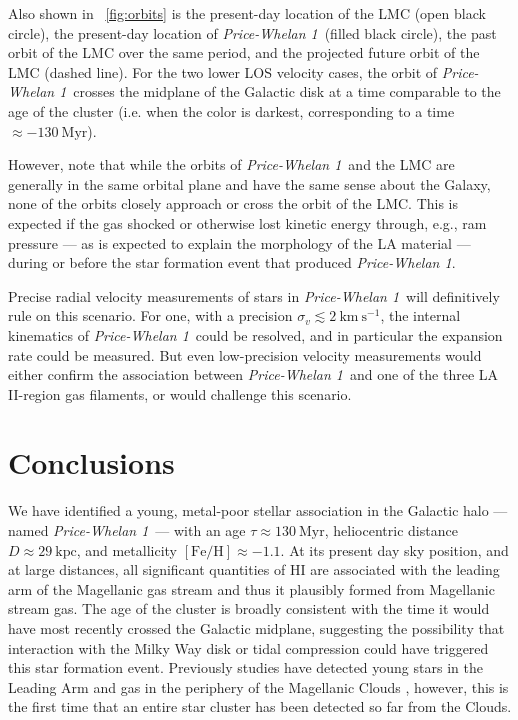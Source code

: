 \documentclass[twocolumn]{aastex62}
\newcommand{\kms}{\ensuremath{\textrm{km}~\textrm{s}^{-1}}}
\newcommand{\feh}{\ensuremath{[\textrm{Fe} / \textrm{H}]}}
\newcommand{\hi}{H{\footnotesize I} }
\newcommand{\clustername}{\textsl{Price-Whelan 1}}
\newcommand{\clage}{\ensuremath{130~\textrm{Myr}}}
\newcommand{\clfeh}{\ensuremath{-1.1}}
\newcommand{\cldist}{\ensuremath{29~\textrm{kpc}}}
\begin{document}
Also shown in \figurename~\ref{fig:orbits} is the present-day location of the LMC (open black circle), the present-day location of \clustername\ (filled black circle), the past orbit of the LMC over the same period, and the projected future orbit of the LMC (dashed line).
For the two lower LOS velocity cases, the orbit of \clustername\ crosses the midplane of the Galactic disk at a time comparable to the age of the cluster (i.e. when the color is darkest, corresponding to a time $\approx -130~\textrm{Myr}$).

However, note that while the orbits of \clustername\ and the LMC are generally in the same orbital plane and have the same sense about the Galaxy, none of the orbits closely approach or cross the orbit of the LMC.
This is expected if the gas shocked or otherwise lost kinetic energy through, e.g., ram pressure --- as is expected to explain the morphology of the LA material \citep[e.g.,][]{Hammer:2015} --- during or before the star formation event that produced \clustername.

Precise radial velocity measurements of stars in \clustername\ will definitively rule on this scenario.
For one, with a precision $\sigma_v \lesssim 2~\kms$, the internal kinematics of \clustername\ could be resolved, and in particular the expansion rate could be measured.
But even low-precision velocity measurements would either confirm the association between \clustername\ and one of the three LA II-region gas filaments, or would challenge this scenario.


\section{Conclusions} \label{sec:conclusion}

We have identified a young, metal-poor stellar association in the Galactic halo --- named \clustername\ --- with an age $\tau \approx \clage$, heliocentric distance $D \approx \cldist$, and metallicity $\feh \approx \clfeh$.
At its present day sky position, and at large distances, all significant quantities of \hi are associated with the leading arm of the Magellanic gas stream and thus it plausibly formed from Magellanic stream gas.
The age of the cluster is broadly consistent with the time it would have most recently crossed the Galactic midplane, suggesting the possibility that interaction with the Milky Way disk or tidal compression could have triggered this star formation event.
Previously studies have detected young stars in the Leading Arm and gas in the periphery of the Magellanic Clouds \citep{Casetti-Dinescu:2014, Moni-Bidin:2017}, however, this is the first time that an entire star cluster has been detected so far from the Clouds.
\end{document}
